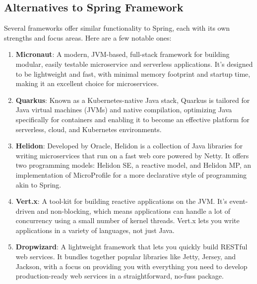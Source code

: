 \documentclass[a4paper,12pt]{article}
\begin{document}
\subsection{Alternatives to Spring Framework}
Several frameworks offer similar functionality to Spring, each with its own strengths and focus areas.
Here are a few notable ones:
\begin{enumerate}
    \item \textbf{Micronaut}: A modern, JVM-based, full-stack framework for building modular,
    easily testable microservice and serverless applications.
    It's designed to be lightweight and fast, with minimal memory footprint and startup time, making it an excellent choice for microservices.
    \item \textbf{Quarkus}: Known as a Kubernetes-native Java stack,
    Quarkus is tailored for Java virtual machines (JVMs) and native compilation,
    optimizing Java specifically for containers and enabling it to become an effective platform
    for serverless, cloud, and Kubernetes environments.
    \item \textbf{Helidon}: Developed by Oracle, Helidon is a collection of Java libraries
    for writing microservices that run on a fast web core powered by Netty.
    It offers two programming models: Helidon SE, a reactive model, and Helidon MP,
    an implementation of MicroProfile for a more declarative style of programming akin to Spring.
    \item \textbf{Vert.x}: A tool-kit for building reactive applications on the JVM.
    It's event-driven and non-blocking, which means applications can handle
    a lot of concurrency using a small number of kernel threads.
    Vert.x lets you write applications in a variety of languages, not just Java.
    \item \textbf{Dropwizard}: A lightweight framework that lets you quickly build RESTful
    web services. It bundles together popular libraries like Jetty, Jersey, and Jackson,
    with a focus on providing you with everything you need to develop production-ready
    web services in a straightforward, no-fuss package.
\end{enumerate}
\end{document}
